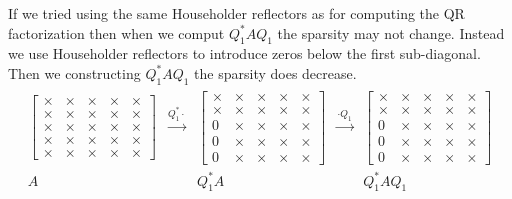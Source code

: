\documentclass[12pt]{article}
\begin{document}
If we tried using the same Householder reflectors as for computing the QR factorization then when we comput \( Q_1^*AQ_1 \) the sparsity may not change. Instead we use Householder reflectors to introduce zeros below the first sub-diagonal. Then we constructing \( Q_1^*AQ_1 \) the sparsity does decrease.
\begin{align*}
    \begin{array}{ccccccc}
    \left[\begin{array}{ccccc}
    \times & \times & \times & \times & \times \\
    \times & \times & \times & \times & \times \\
    \times & \times & \times & \times & \times \\
    \times & \times & \times & \times & \times \\
    \times & \times & \times & \times & \times
    \end{array}\right]
    &\xrightarrow{Q_1^* \cdot}&
    \left[\begin{array}{ccccc}
    \times & \times & \times & \times & \times \\
    \boldsymbol \times & \boldsymbol \times & \boldsymbol\times & \boldsymbol\times & \boldsymbol\times \\
    0 & \boldsymbol\times & \boldsymbol\times & \boldsymbol\times & \boldsymbol\times \\
    0 & \boldsymbol\times & \boldsymbol\times & \boldsymbol\times & \boldsymbol\times \\
    0 & \boldsymbol\times & \boldsymbol\times & \boldsymbol\times & \boldsymbol\times
    \end{array}\right]
    &\xrightarrow{\cdot Q_1}&
    \left[\begin{array}{ccccc}
    \times & \boldsymbol\times & \boldsymbol\times & \boldsymbol\times & \boldsymbol\times \\
    \times & \boldsymbol \times & \boldsymbol\times & \boldsymbol\times & \boldsymbol\times \\
    0 & \boldsymbol\times & \boldsymbol\times & \boldsymbol\times & \boldsymbol\times \\
    0 & \boldsymbol\times & \boldsymbol\times & \boldsymbol\times & \boldsymbol\times \\
    0 & \boldsymbol\times & \boldsymbol\times & \boldsymbol\times & \boldsymbol\times
    \end{array}\right]
    \\
    A & & Q_1^*A & & Q_1^*AQ_1
\end{array}
\end{align*}
\end{document}

